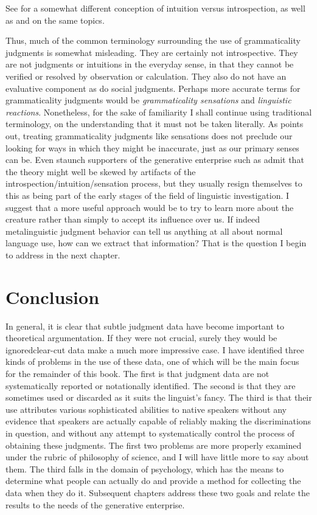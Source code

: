 \noindent
See \citet[117]{Carr1990} for a somewhat different conception of intuition versus introspection, as well as \citet{Katz1981} and \citet{Lyons1986} on the same topics.

Thus, much of the common terminology surrounding the use of grammaticality judgments is somewhat misleading. They are certainly not introspective. They are not judgments or intuitions in the everyday sense, in that they cannot be verified or resolved by observation or calculation. They also do not have an evaluative component as do social judgments. Perhaps more accurate terms for grammaticality judgments would be \textit{grammaticality sensations} and \textit{linguistic reactions}. Nonetheless, for the sake of familiarity I shall continue using traditional terminology, on the understanding that it must not be taken literally. As \citet{Pateman1987}
points out, treating grammaticality judgments like sensations does not preclude our looking for ways in which they might be inaccurate, just as our primary senses can be. Even staunch supporters of the generative enterprise such as \citet{Newmeyer1983} admit that the theory might well be skewed by artifacts of the introspection/intuition/sensation process, but they usually resign themselves to this as being part of the early stages of the field of linguistic investigation. I suggest that a more useful approach would be to try to learn more about the creature rather than simply to accept its influence over us. If indeed metalinguistic judgment behavior can tell us anything at all about normal language use, how can we extract that information? That is the question I begin to address in the next chapter.

\section{Conclusion}

In general, it is clear that subtle judgment data have become important to theoretical argumentation. If they were not crucial, surely they would be ignored\schdash{}clear-cut data make a much more impressive case. I have identified three kinds of problems in the use of these data, one of which will be the main focus for the remainder of this book. The first is that judgment data are not systematically reported or notationally identified. The second is that they are sometimes used or discarded as it suits the linguist's fancy. The third is that their use attributes various sophisticated abilities to native speakers without any evidence that speakers are actually capable of reliably making the discriminations in question, and without any attempt to systematically control the process of obtaining these judgments. The first two problems are more properly examined under the rubric of philosophy of science, and I will have little more to say about them. The third falls in the domain of psychology, which has the means to determine what people can actually do and provide a method for collecting the data when they do it. Subsequent chapters address these two goals and relate the results to the needs of the generative  enterprise.
